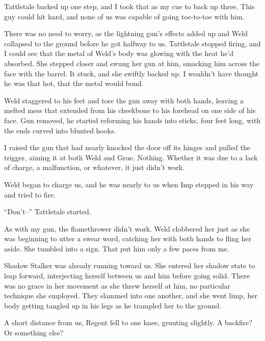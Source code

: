 Tattletale backed up one step, and I took that as my cue to back up three. This guy could hit hard, and none of us was capable of going toe-to-toe with him.



There was no need to worry, as the lightning gun's effects added up and Weld collapsed to the ground before he got halfway to us.  Tattletale stopped firing, and I could see that the metal of Weld's body was glowing with the heat he'd absorbed.  She stepped closer and swung her gun at him, smacking him across the face with the barrel.  It stuck, and she swiftly backed up.  I wouldn't have thought he was that hot, that the metal would bond.



Weld staggered to his feet and tore the gun away with both hands, leaving a melted mess that extended from his cheekbone to his forehead on one side of his face.  Gun removed, he started reforming his hands into sticks, four feet long, with the ends curved into blunted hooks.



I raised the gun that had nearly knocked the door off its hinges and pulled the trigger, aiming it at both Weld and Grue.  Nothing.  Whether it was due to a lack of charge, a malfunction, or whatever, it just didn't work.



Weld began to charge us, and he was nearly to us when Imp stepped in his way and tried to fire.



``Don't--'' Tattletale started.



As with my gun, the flamethrower didn't work.  Weld clobbered her just as she was beginning to utter a swear word, catching her with both hands to fling her aside.  She tumbled into a sign.  That put him only a few paces from me.



Shadow Stalker was already running toward us.  She entered her shadow state to leap forward, interjecting herself between us and him before going solid.  There was no grace in her movement as she threw herself at him, no particular technique she employed.  They slammed into one another, and she went limp, her body getting tangled up in his legs as he trampled her to the ground.



A short distance from us, Regent fell to one knee, grunting slightly.  A backfire?  Or something else?



